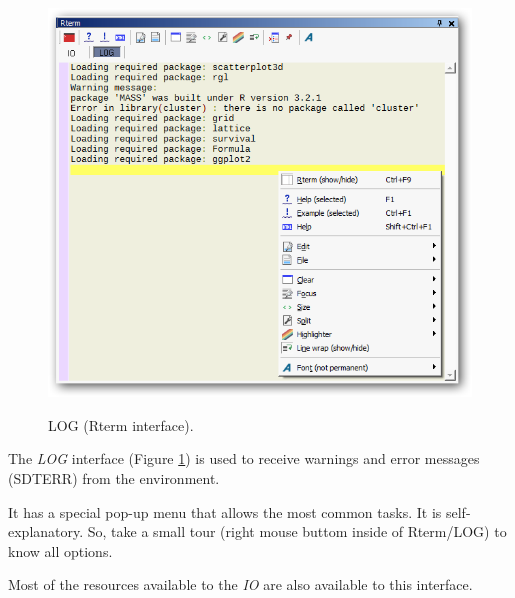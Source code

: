 \begin{figure}[h!]
  \includegraphics[scale=0.35]{./res/rterm_log.png}\\
  \caption{LOG (Rterm interface).}
  \label{fig:rterm_log}
\end{figure}

The \textit{LOG} interface
(Figure \ref{fig:rterm_log})
is used to receive warnings and error messages (SDTERR) from the \RR{} environment.

It has a special pop-up menu that allows the most common tasks. It is
self-explanatory. So, take a small tour (right mouse buttom inside of
Rterm/LOG) to know all options.

Most of the resources available to the \textit{IO} are also available to this
interface.
